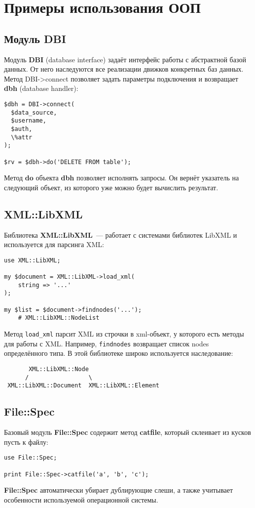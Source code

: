 \section{Примеры использования ООП}%
\subsection{Модуль DBI}
Модуль \textbf{DBI} (database interface) задаёт интерфейс работы с абстрактной базой данных. От него наследуются все реализации движков конкретных баз данных. Метод DBI->connect позволяет задать параметры подключения и возвращает  \textbf{dbh} (database handler):
\begin{verbatim}
$dbh = DBI->connect(
  $data_source,
  $username,
  $auth,
  \%attr
);

$rv = $dbh->do('DELETE FROM table');
\end{verbatim}
Метод \textbf{do} объекта \textbf{dbh} позволяет исполнять запросы. Он вернёт указатель на следующий объект, из которого уже можно будет вычислить результат.


\subsection{XML::LibXML}%
Библиотека \textbf{XML::LibXML}~--- работает с системами библиотек LibXML и используется для парсинга XML:
\begin{verbatim}
use XML::LibXML;

my $document = XML::LibXML->load_xml(
    string => '...'
);

my $list = $document->findnodes('...');
    # XML::LibXML::NodeList
\end{verbatim}

Метод \verb|load_xml| парсит XML из строчки в xml-объект, у которого есть методы для работы с XML. Например, \verb|findnodes| возвращает список nodes определённого типа. В этой библиотеке широко используется наследование:
\begin{verbatim}
       XML::LibXML::Node
      /                 \
 XML::LibXML::Document  XML::LibXML::Element
\end{verbatim}

\subsection{File::Spec}%
Базовый модуль \textbf{File::Spec} содержит метод \textbf{catfile}, который склеивает из кусков пусть к файлу:
\begin{verbatim}
use File::Spec;

print File::Spec->catfile('a', 'b', 'c');
\end{verbatim}
\textbf{File::Spec} автоматически убирает дублирующие слеши, а также учитывает особенности используемой операционной системы.

